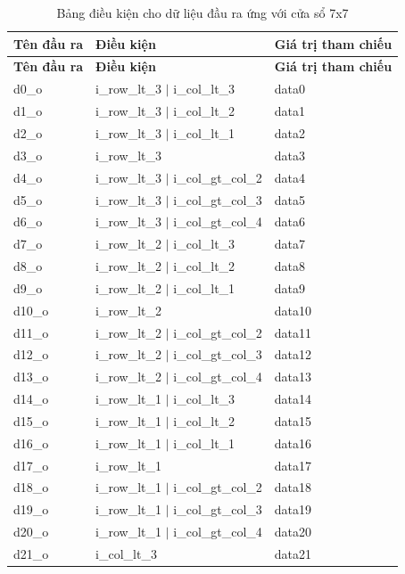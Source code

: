 \begin{longtable}{|p{3cm}|p{8cm}|p{4cm}|}
			\caption{Bảng điều kiện cho dữ liệu đầu ra ứng với cửa sổ 7x7} \\
	\hline
	\rowcolor{gray!30}
	\textbf{Tên đầu ra} & \textbf{Điều kiện} & \textbf{Giá trị tham chiếu} \\
	\hline
	\endfirsthead
	
	\hline
	\rowcolor{gray!30}
	\textbf{Tên đầu ra} & \textbf{Điều kiện} & \textbf{Giá trị tham chiếu} \\
	\hline
	\endhead
	d0\_o & i\_row\_lt\_3 $\vert$ i\_col\_lt\_3 & data0 \\
	d1\_o & i\_row\_lt\_3 $\vert$ i\_col\_lt\_2 & data1 \\
	d2\_o & i\_row\_lt\_3 $\vert$ i\_col\_lt\_1 & data2 \\
	d3\_o & i\_row\_lt\_3 & data3 \\
	d4\_o & i\_row\_lt\_3 $\vert$ i\_col\_gt\_col\_2 & data4 \\
	d5\_o & i\_row\_lt\_3 $\vert$ i\_col\_gt\_col\_3 & data5 \\
	d6\_o & i\_row\_lt\_3 $\vert$ i\_col\_gt\_col\_4 & data6 \\
	d7\_o & i\_row\_lt\_2 $\vert$ i\_col\_lt\_3 & data7 \\
	d8\_o & i\_row\_lt\_2 $\vert$ i\_col\_lt\_2 & data8 \\
	d9\_o & i\_row\_lt\_2 $\vert$ i\_col\_lt\_1 & data9 \\
	d10\_o & i\_row\_lt\_2 & data10 \\
	d11\_o & i\_row\_lt\_2 $\vert$ i\_col\_gt\_col\_2 & data11 \\
	d12\_o & i\_row\_lt\_2 $\vert$ i\_col\_gt\_col\_3 & data12 \\
	d13\_o & i\_row\_lt\_2 $\vert$ i\_col\_gt\_col\_4 & data13 \\
	d14\_o & i\_row\_lt\_1 $\vert$ i\_col\_lt\_3 & data14 \\
	d15\_o & i\_row\_lt\_1 $\vert$ i\_col\_lt\_2 & data15 \\
	d16\_o & i\_row\_lt\_1 $\vert$ i\_col\_lt\_1 & data16 \\
	d17\_o & i\_row\_lt\_1 & data17 \\
	d18\_o & i\_row\_lt\_1 $\vert$ i\_col\_gt\_col\_2 & data18 \\
	d19\_o & i\_row\_lt\_1 $\vert$ i\_col\_gt\_col\_3 & data19 \\
	d20\_o & i\_row\_lt\_1 $\vert$ i\_col\_gt\_col\_4 & data20 \\
	d21\_o & i\_col\_lt\_3 & data21 \\

\end{longtable}
